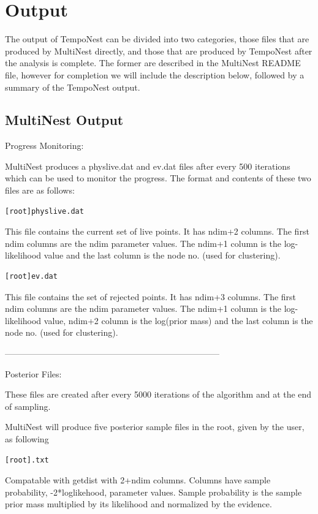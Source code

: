 \documentclass[%
 preprint,
 amsmath,amssymb,amsfonts,
 aps,
]{revtex4-1}
\begin{document}
\section{Output}
\label{Section:Output}


The output of TempoNest can be divided into two categories, those files that are produced by MultiNest directly, and those that are produced by TempoNest after the analysis is complete.  The former are described in the MultiNest README file, however for completion we will include the description below, followed by a summary of the TempoNest output.

\subsection{MultiNest Output}

Progress Monitoring:

MultiNest produces a physlive.dat and ev.dat files after every 500 iterations which can be used to
monitor the progress. The format and contents of  these two files are as follows:

\begin{lstlisting}
[root]physlive.dat
\end{lstlisting}
This file contains the current set of live points. It has ndim+2 columns. The first ndim columns are the ndim
parameter values. The ndim+1 column is the log-likelihood value and
the last column is the node no. (used for clustering).

\begin{lstlisting}
[root]ev.dat
\end{lstlisting}
This file contains the set of rejected points. It has ndim+3 columns. The first ndim columns are the ndim
parameter values. The ndim+1 column is the log-likelihood value,
ndim+2 column is the log(prior mass) and the last column  is the node no. (used for clustering).

---------------------------------------------------------------------------

Posterior Files:

These files are created after every 5000 iterations of the algorithm and at the end of sampling.

MultiNest will produce five posterior sample files in the root, given by the user, as following

\begin{lstlisting}
[root].txt
\end{lstlisting}
Compatable with getdist with 2+ndim columns. Columns have sample probability, -2*loglikehood, parameter values. 
Sample probability is the sample prior mass multiplied by its likelihood and normalized by the evidence.
\end{document}
